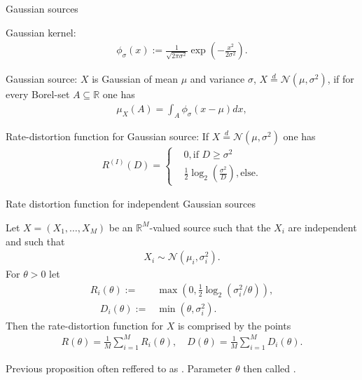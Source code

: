 \begin{frame}{Gaussian sources}
\bit
\item Gaussian kernel: 
\begin{align*}
\phi_{\sigma}(x):=\frac{1}{\sqrt{2\pi\sigma^2}}\exp\left(-\frac{x^2}{2\sigma^2}\right).
\end{align*}
\item Gaussian source: $X$ is Gaussian of mean $\mu$ and variance $\sigma$, $X\stackrel{d}{=} \mathcal{N}(\mu,\sigma^2)$, if 
for every Borel-set $A\subseteq \mathbb{R}$ one has
\begin{align*}
\mu_X(A)=\int_A\phi_\sigma(x-\mu)dx,
\end{align*}
\item Rate-distortion function for Gaussian source: If $X\stackrel{d}{=} \mathcal{N}(\mu,\sigma^2)$ one has 
\begin{align}\label{RDGauss}
R^{(I)}(D)=\begin{cases} &0, \text{if $D\geq \sigma^2$} \\ &\frac{1}{2}\log_2\left(\frac{\sigma^2}{D}\right), \text{else.} \end{cases}
\end{align}
\eit
\end{frame}






\begin{frame}{Rate distortion function for independent Gaussian sources}
\begin{proposition}
Let $X=(X_1,\dots,X_M)$ be an $\mathbb{R}^M$-valued source such that the $X_i$ are independent 
and such that 
\begin{align*}
X_i\sim \mathcal{N}(\mu_i,\sigma_i^2). 
\end{align*}
For $\theta>0$ let 
\begin{align*}
R_i(\theta):=&\max(0,\frac{1}{2}\log_2(\sigma_i^2/\theta)), \\ 
\quad D_i(\theta):= &\min(\theta,\sigma_i^2).
\end{align*}
Then the rate-distortion function for $X$ is comprised by the points
\begin{align*}
R(\theta)=\frac{1}{M}\sum_{i=1}^MR_i(\theta),\quad D(\theta)=\frac{1}{M}\sum_{i=1}^MD_i(\theta). 
\end{align*}
\end{proposition}

Previous proposition often reffered to as .
Parameter $\theta$ then called .
\end{frame}



